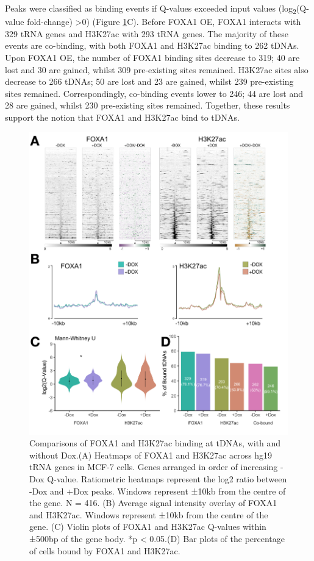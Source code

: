 \documentclass[
  12pt,
]{article}
\begin{document}
Peaks were classified as binding events if Q-values exceeded input values (log\textsubscript{2}(Q-value fold-change) \textgreater0) (Figure \ref{fig:results-1}C).
Before FOXA1 OE, FOXA1 interacts with 329 tRNA genes and H3K27ac with 293 tRNA genes.
The majority of these events are co-binding, with both FOXA1 and H3K27ac binding to 262 tDNAs.
Upon FOXA1 OE, the number of FOXA1 binding sites decrease to 319; 40 are lost and 30 are gained, whilst 309 pre-existing sites remained.
H3K27ac sites also decrease to 266 tDNAs; 50 are lost and 23 are gained, whilst 239 pre-existing sites remained.
Correspondingly, co-binding events lower to 246; 44 are lost and 28 are gained, whilst 230 pre-existing sites remained.
Together, these results support the notion that FOXA1 and H3K27ac bind to tDNAs.

\begin{figure}[p]
\includegraphics[width=1\linewidth]{../images/results-01} \caption{Comparisons of FOXA1 and H3K27ac binding at tDNAs, with and without Dox.(A) Heatmaps of FOXA1 and H3K27ac across hg19 tRNA genes in MCF-7 cells. Genes arranged in order of increasing -Dox Q-value. Ratiometric heatmaps represent the log2 ratio between -Dox and +Dox peaks. Windows represent ±10kb from the centre of the gene. N = 416. (B) Average signal intensity overlay of FOXA1 and H3K27ac. Windows represent ±10kb from the centre of the gene. (C) Violin plots of FOXA1 and H3K27ac Q-values within ±500bp of the gene body. *p < 0.05.(D) Bar plots of the percentage of cells bound by FOXA1 and H3K27ac. }\label{fig:results-1}
\end{figure}
\end{document}
